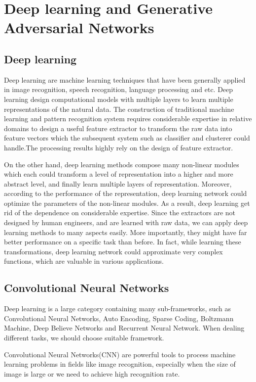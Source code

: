 
\chapter{Deep learning and Generative Adversarial Networks}



\section{Deep learning}
Deep learning are machine learning techniques that have been generally applied in image recognition, speech recognition, language processing and etc. Deep learning design computational models with multiple layers to learn multiple representations of the natural data. The construction of traditional machine learning and pattern recognition system requires considerable expertise in relative domains to design a useful feature extractor to transform the raw data into feature vectors which the subsequent system such as classifier and clusterer could handle.The processing results highly rely on the design of feature extractor. 

On the other hand, deep learning methods compose many non-linear modules which each could transform a level of representation into a higher and more abstract level, and finally learn multiple layers of representation. Moreover, according to the performance of the representation, deep learning network could optimize the parameters of the non-linear modules. As a result, deep learning get rid of the dependence on considerable expertise. Since the extractors are not designed by human engineers, and are learned with raw data, we can apply deep learning methods to many aspects easily. More importantly, they might have far better performance on a specific task than before. In fact, while learning these transformations, deep learning network could approximate very complex functions, which are valuable in various applications.


\section{Convolutional Neural Networks}
Deep learning is a large category containing many sub-frameworks, such as Convolutional Neural Networks, Auto Encoding, Sparse Coding, Boltzmann Machine, Deep Believe Networks and Recurrent Neural Network. When dealing different tasks, we should choose suitable framework.

Convolutional Neural Networks(CNN) are powerful tools to process machine learning problems in fields like image recognition, especially when the size of image is large or we need to achieve high recognition rate.


